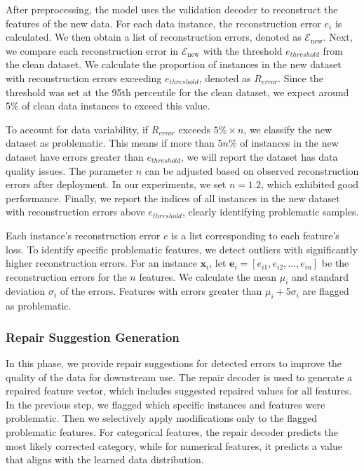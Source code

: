 {
After preprocessing, the model uses the validation decoder to reconstruct the features of the new data. 
For each data instance, the reconstruction error $e_i$ is calculated. We then obtain a list of reconstruction errors, denoted as \(\mathcal{E}_{\text{new}}\).
Next, we compare each reconstruction error in \(\mathcal{E}_{\text{new}}\) with the threshold \( e_{threshold} \) from the clean dataset. 
We calculate the proportion of instances in the new dataset with reconstruction errors exceeding \( e_{threshold} \), denoted as \( R_{error} \). 
Since the threshold was set at the 95th percentile for the clean dataset, we expect around 5\% of clean data instances to exceed this value. 

To account for data variability, if \( R_{error} \) exceeds \( 5\% \times n \), we classify the new dataset as problematic. This means if more than \( 5n\% \) of instances in the new dataset have errors greater than \( e_{threshold} \), we will report the dataset has data quality issues. The parameter \( n \) can be adjusted based on observed reconstruction errors after deployment.
In our experiments, we set \( n = 1.2 \), which exhibited good performance.
Finally, we report the indices of all instances in the new dataset with reconstruction errors above \( e_{threshold} \), clearly identifying problematic samples.


Each instance's reconstruction error \( e \) is a list corresponding to each feature's loss. To identify specific problematic features, we detect outliers with significantly higher reconstruction errors.
For an instance \( \mathbf{x}_i \), let \( \mathbf{e}_i = [e_{i1}, e_{i2}, \ldots, e_{in}] \) be the reconstruction errors for the \( n \) features. We calculate the mean \( \mu_i \) and standard deviation \( \sigma_i \) of the errors. Features with errors greater than \( \mu_i + 5\sigma_i \) are flagged as problematic.


\subsubsection{\textbf{Repair Suggestion Generation}}
In this phase, we provide repair suggestions for detected errors to improve the quality of the data for downstream use.
The repair decoder is used to generate a repaired feature vector, which includes suggested repaired values for all features. 
In the previous step, we flagged which specific instances and features were problematic. 
Then we selectively apply modifications only to the flagged problematic features. For categorical features, the repair decoder predicts the most likely corrected category, while for numerical features, it predicts a value that aligns with the learned data distribution. 


}
